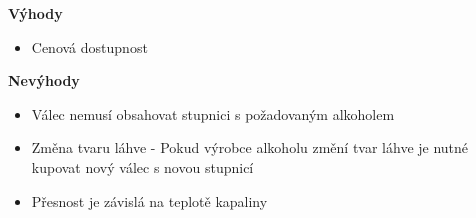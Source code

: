 

\textbf{Výhody}
\begin{itemize}
    \item Cenová dostupnost\\
\end{itemize}

\textbf{Nevýhody}
\begin{itemize}
    \item Válec nemusí obsahovat stupnici s požadovaným alkoholem
    \item Změna tvaru láhve - Pokud výrobce alkoholu změní tvar láhve je nutné kupovat nový válec s novou stupnicí
    \item Přesnost je závislá na teplotě kapaliny
\end{itemize}

